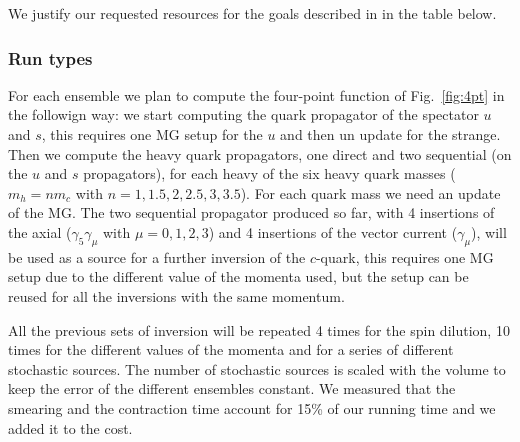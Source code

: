 

We justify our requested resources for the goals described
in  in the table below.

\subsubsection{Run types \label{sec:runtypes}}

For each ensemble we plan to compute the four-point function of Fig.~\ref{fig:4pt} in the followign way: we start computing the quark propagator of the spectator $u$ and $s$, this requires 
one MG setup for the $u$ and then un update for the strange.
Then we compute the heavy quark propagators, one direct and two sequential (on the $u$ and $s$ propagators), for each heavy of the six heavy quark masses ($m_h=n m_c$ with $n=1, 1.5, 2, 2.5, 3, 3.5$). For each quark mass we need an update of the MG.
The two sequential propagator produced so far, with 4 insertions of the axial ($\gamma_5\gamma_\mu$ with $\mu=0,1,2,3$) and 4 insertions of the vector current ($\gamma_\mu$), will be used as a source for a further inversion of the $c$-quark, this requires one MG setup due to the different value of the momenta used, but the setup can be reused for all the inversions with the same momentum. 

All the previous sets of inversion will be repeated 4 times for the spin dilution, 10 times for the different values of the momenta and for a series of different stochastic sources.
The number of stochastic sources is scaled with the volume to keep the error of the different ensembles constant. We measured that the smearing and the contraction time account for 15\% of our running time and we added it to the cost.

